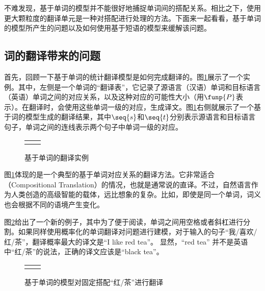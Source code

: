 不难发现，基于单词的模型并不能很好地捕捉单词间的搭配关系。相比之下，使用更大颗粒度的翻译单元是一种对搭配进行处理的方法。下面来一起看看，基于单词的模型所产生的问题以及如何使用基于短语的模型来缓解该问题。


\subsection{词的翻译带来的问题}

\parinterval 首先，回顾一下基于单词的统计翻译模型是如何完成翻译的。图\ref{fig:7-1}展示了一个实例。其中，左侧是一个单词的“翻译表”，它记录了源语言（汉语）单词和目标语言（英语）单词之间的对应关系，以及这种对应的可能性大小（用$\funp{P}$表示）。在翻译时，会使用这些单词一级的对应，生成译文。图\ref{fig:7-1}右侧就展示了一个基于词的模型生成的翻译结果，其中$\seq{s}$和$\seq{t}$分别表示源语言和目标语言句子，单词之间的连线表示两个句子中单词一级的对应。

\begin{figure}[htp]
\centering
\begin{tabular}{l r}
\subfigure{} & \subfigure{} \\
\end{tabular}
\caption{基于单词的翻译实例}
\label{fig:7-1}
\end{figure}

\parinterval 图\ref{fig:7-1}体现的是一个典型的基于单词对应关系的翻译方法。它非常适合{\small{}}（Compositional Translation）的情况，也就是通常说的直译。不过，自然语言作为人类创造的高级智能的载体，远比想象的复杂。比如，即使是同一个单词，词义也会根据不同的语境产生变化。

\parinterval 图\ref{fig:7-2}给出了一个新的例子，其中为了便于阅读，单词之间用空格或者斜杠进行分割。如果同样使用概率化的单词翻译对问题进行建模，对于输入的句子“我/喜欢/红/茶”，翻译概率最大的译文是“I like red tea”。 显然，“red tea” 并不是英语中“红/茶”的说法，正确的译文应该是“black tea”。

\begin{figure}[htp]
\centering
\begin{tabular}{l r}
\subfigure{} & \subfigure{}
\end{tabular}
\caption{基于单词的模型对固定搭配“红/茶”进行翻译}
\label{fig:7-2}
\end{figure}

